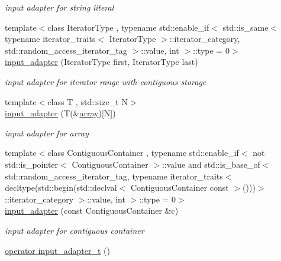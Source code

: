 \begin{DoxyCompactItemize}
\begin{DoxyCompactList}\small\item\em input adapter for string literal \end{DoxyCompactList}\item 
{\footnotesize template$<$class Iterator\+Type , typename std\+::enable\+\_\+if$<$ std\+::is\+\_\+same$<$ typename iterator\+\_\+traits$<$ Iterator\+Type $>$\+::iterator\+\_\+category, std\+::random\+\_\+access\+\_\+iterator\+\_\+tag $>$\+::value, int $>$\+::type  = 0$>$ }\\\hyperlink{classnlohmann_1_1detail_1_1input__adapter_ad6824b0f792691f75186c527fa31a6b4}{input\+\_\+adapter} (Iterator\+Type first, Iterator\+Type last)
\begin{DoxyCompactList}\small\item\em input adapter for iterator range with contiguous storage \end{DoxyCompactList}\item 
{\footnotesize template$<$class T , std\+::size\+\_\+t N$>$ }\\\hyperlink{classnlohmann_1_1detail_1_1input__adapter_aa2392138bf8307df1994dc7eb22d51ce}{input\+\_\+adapter} (T(\&\hyperlink{namespacenlohmann_1_1detail_a1ed8fc6239da25abcaf681d30ace4985af1f713c9e000f5d3f280adbd124df4f5}{array})\mbox{[}N\mbox{]})
\begin{DoxyCompactList}\small\item\em input adapter for array \end{DoxyCompactList}\item 
{\footnotesize template$<$class Contiguous\+Container , typename std\+::enable\+\_\+if$<$ not std\+::is\+\_\+pointer$<$ Contiguous\+Container $>$\+::value and std\+::is\+\_\+base\+\_\+of$<$ std\+::random\+\_\+access\+\_\+iterator\+\_\+tag, typename iterator\+\_\+traits$<$ decltype(std\+::begin(std\+::declval$<$ Contiguous\+Container const $>$()))$>$\+::iterator\+\_\+category $>$\+::value, int $>$\+::type  = 0$>$ }\\\hyperlink{classnlohmann_1_1detail_1_1input__adapter_a6f92fe82cb49a508dbfb297c5630cc7f}{input\+\_\+adapter} (const Contiguous\+Container \&c)
\begin{DoxyCompactList}\small\item\em input adapter for contiguous container \end{DoxyCompactList}\item 
\hyperlink{classnlohmann_1_1detail_1_1input__adapter_a4ef04b9490247fc38f3d1c2a9e18789b}{operator input\+\_\+adapter\+\_\+t} ()
\end{DoxyCompactItemize}
